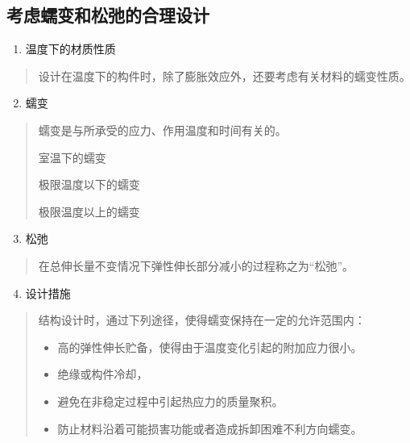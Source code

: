 \documentclass[letterpaper,10pt,english]{sphinxmanual}
\begin{document}
\subsection{考虑蠕变和松弛的合理设计}
\label{unit6:id16}\begin{enumerate}
\item {} 
温度下的材质性质

\end{enumerate}
\begin{quote}

设计在温度下的构件时，除了膨胀效应外，还要考虑有关材料的蠕变性质。
\end{quote}
\begin{enumerate}
\setcounter{enumi}{1}
\item {} 
蠕变

\end{enumerate}
\begin{quote}

蠕变是与所承受的应力、作用温度和时间有关的。

室温下的蠕变

极限温度以下的蠕变

极限温度以上的蠕变
\end{quote}
\begin{enumerate}
\setcounter{enumi}{2}
\item {} 
松弛

\end{enumerate}
\begin{quote}

在总伸长量不变情况下弹性伸长部分减小的过程称之为“松弛”。
\end{quote}
\begin{enumerate}
\setcounter{enumi}{3}
\item {} 
设计措施

\end{enumerate}
\begin{quote}

结构设计时，通过下列途径，使得蠕变保持在一定的允许范围内：
\begin{itemize}
\item {} 
高的弹性伸长贮备，使得由于温度变化引起的附加应力很小。

\item {} 
绝缘或构件冷却，

\item {} 
避免在非稳定过程中引起热应力的质量聚积。

\item {} 
防止材料沿着可能损害功能或者造成拆卸困难不利方向蠕变。

\end{itemize}
\end{quote}
\end{document}
